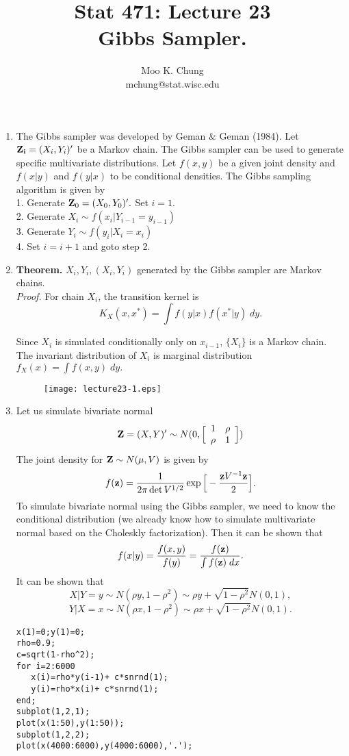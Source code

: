 \documentclass[12pt,twocolumn]{article} %
\begin{document}
\title{Stat 471: Lecture 23\\
Gibbs Sampler.}
\author{Moo K. Chung\\
mchung@stat.wisc.edu}
\maketitle \thispagestyle{empty}
\begin{enumerate}

\item The Gibbs sampler was developed by Geman $\&$ Geman (1984). Let ${\bf Z_i}=(X_i,Y_i)'$ be a Markov chain. The Gibbs sampler can be used to generate specific multivariate distributions. Let $f(x,y)$ be a given joint density and $f(x|y)$ and $f(y|x)$ to be conditional densities. The Gibbs sampling algorithm is given by\\

1. Generate ${\bf Z}_0=(X_0,Y_0)'.$ Set $i=1$.\\
2. Generate $X_{i} \sim f(x_i|Y_{i-1}=y_{i-1})$\\
3. Generate $Y_{i} \sim f(y_{i}|X_{i}=x_{i})$\\
4. Set $i = i+1$ and goto step 2.\\
\item {\bf Theorem.} $X_i, Y_i, (X_i,Y_i)$ generated by the Gibbs
sampler are Markov chains.\\ {\em Proof.} For chain $X_i$, the
transition kernel is
$$K_X(x,x^*) = \int f(y|x)f(x^*|y)\; dy.$$

Since $X_i$ is simulated conditionally only on $x_{i-1}$, $\{ X_i
\}$ is a Markov chain. The invariant distribution of $X_i$ is
marginal distribution $f_X(x) =\int f(x,y) \; dy.$
\begin{figure}
\centering
\renewcommand{\baselinestretch}{1}
\texttt{[image: lecture23-1.eps]}
\end{figure}
\item Let us simulate bivariate normal
$${\bf Z} =(X,Y)' \sim N(0, \Big[\begin{array}{cc}
                                     1 & \rho\\
                                     \rho & 1 \end{array}\Big])$$
The joint density for ${\bf Z} \sim N(\mu,V)$ is given by
$$f({\bf z}) = \frac{1}{2\pi \det V^{1/2}}\exp\Big[-\frac{{\bf z}V^{-1}{\bf z}}{2}\Big].$$
To simulate bivariate normal using the Gibbs sampler, we need to know the conditional distribution (we already know how to simulate multivariate normal based on the Choleskly factorization). Then it can be shown that
$$f(x|y)= \frac{f(x,y)}{f(y)}=\frac{f({\bf z})}{\int f({\bf z}) \;dx}.$$
It can be shown that
$$X|Y=y \sim N(\rho y, 1-\rho^2) \sim \rho y + \sqrt{1-\rho^2}N(0,1),$$
$$Y|X=x \sim N(\rho x, 1-\rho^2) \sim \rho x + \sqrt{1-\rho^2}N(0,1).$$

\begin{verbatim}
x(1)=0;y(1)=0; 
rho=0.9; 
c=sqrt(1-rho^2);
for i=2:6000
   x(i)=rho*y(i-1)+ c*snrnd(1);
   y(i)=rho*x(i)+ c*snrnd(1); 
end;
subplot(1,2,1);
plot(x(1:50),y(1:50));
subplot(1,2,2);
plot(x(4000:6000),y(4000:6000),'.');
\end{verbatim}

\end{enumerate}
\end{document}
